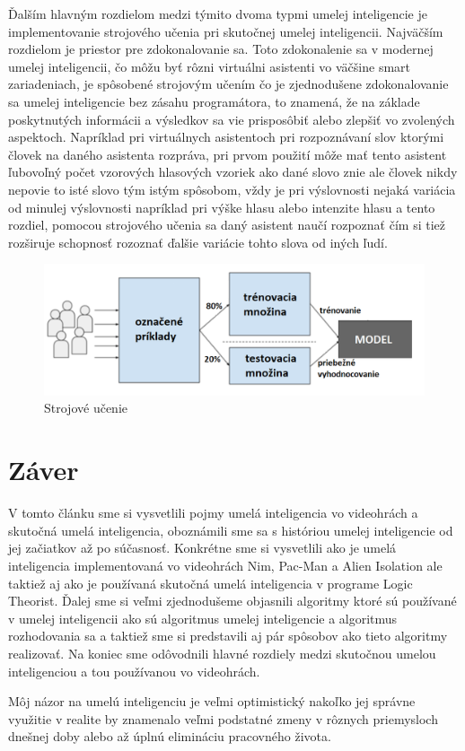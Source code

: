 \documentclass[10pt,oneside,slovak,a4paper]{article}
\begin{document}
Ďalším hlavným rozdielom medzi týmito dvoma typmi umelej inteligencie je implementovanie strojového učenia pri skutočnej umelej inteligencii. Najväčším rozdielom je priestor pre zdokonalovanie sa. Toto zdokonalenie sa v modernej umelej inteligencii, čo môžu byť rôzni virtuálni asistenti vo väčšine smart zariadeniach, je spôsobené strojovým učením čo je zjednodušene zdokonalovanie sa umelej inteligencie bez zásahu programátora, to znamená, že na základe poskytnutých informácii a výsledkov sa vie prisposôbiť alebo zlepšiť vo zvolených aspektoch. Napríklad pri virtuálnych asistentoch pri rozpoznávaní slov ktorými človek na daného asistenta rozpráva, pri prvom použití môže mať tento asistent ľubovoľný počet vzorových hlasových vzoriek ako dané slovo znie ale človek nikdy nepovie to isté slovo tým istým spôsobom, vždy je pri výslovnosti nejaká variácia od minulej výslovnosti napríklad pri výške hlasu alebo intenzite hlasu a tento rozdiel, pomocou strojového učenia sa daný asistent naučí rozpoznať čím si tiež rozširuje schopnosť rozoznať ďalšie variácie tohto slova od iných ľudí.       
\begin{figure}[tbh]
	\centering
	\includegraphics[scale=0.5]{machineLearn.png}
	\caption{Strojové učenie}
	\label{obr7}
\end{figure}

\section{Záver} \label{zaver} %
V tomto článku sme si vysvetlili pojmy umelá inteligencia vo videohrách a skutočná umelá inteligencia, oboznámili sme sa s históriou umelej inteligencie od jej začiatkov až po súčasnosť. Konkrétne sme si vysvetlili ako je umelá inteligencia implementovaná vo videohrách Nim, Pac-Man a Alien Isolation ale taktiež aj ako je používaná skutočná umelá inteligencia v programe Logic Theorist. Ďalej sme si veľmi zjednodušeme objasnili algoritmy ktoré sú používané v umelej inteligencii ako sú algoritmus umelej inteligencie a algoritmus rozhodovania sa a taktiež sme si predstavili aj pár spôsobov ako tieto algoritmy realizovať. Na koniec sme odôvodnili hlavné rozdiely medzi skutočnou umelou inteligenciou a tou používanou vo videohrách. 

Môj názor na umelú inteligenciu je veľmi optimistický nakoľko jej správne využitie v realite by znamenalo veľmi podstatné zmeny v rôznych priemysloch dnešnej doby alebo až úplnú elimináciu pracovného života.





\end{document}
